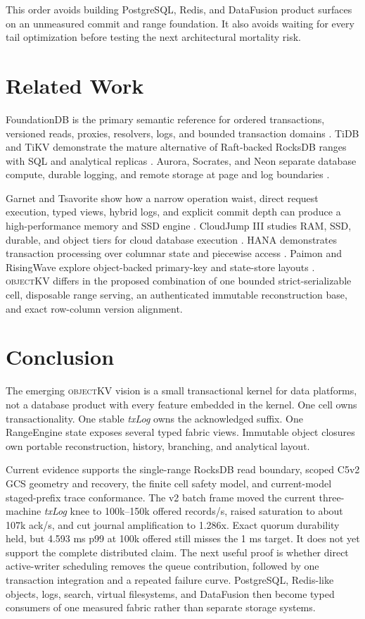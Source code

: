 \documentclass[sigconf,nonacm]{acmart}
\newcommand{\okv}{\textsc{objectKV}}
\newcommand{\txlog}{\textit{txLog}}
\begin{document}
This order avoids building PostgreSQL, Redis, and DataFusion product surfaces on
an unmeasured commit and range foundation. It also avoids waiting for every tail
optimization before testing the next architectural mortality risk.

\section{Related Work}

FoundationDB is the primary semantic reference for ordered transactions,
versioned reads, proxies, resolvers, logs, and bounded transaction domains
\cite{fdb2021}. TiDB and TiKV demonstrate the mature alternative of Raft-backed
RocksDB ranges with SQL and analytical replicas \cite{tidb2020}. Aurora,
Socrates, and Neon separate database compute, durable logging, and remote storage
at page and log boundaries \cite{aurora2017,socrates2019,neon2022}.

Garnet and Tsavorite show how a narrow operation waist, direct request
execution, typed views, hybrid logs, and explicit commit depth can produce a
high-performance memory and SSD engine \cite{garnet2025}. CloudJump III studies
RAM, SSD, durable, and object tiers for cloud database execution
\cite{cloudjumpiii2026}. HANA demonstrates transaction processing over columnar
state and piecewise access \cite{hana2012,hananse2019}. Paimon and RisingWave
explore object-backed primary-key and state-store layouts
\cite{paimonpk,paimonpfile,risingwavestore}. \okv{} differs in the proposed
combination of one bounded strict-serializable cell, disposable range serving,
an authenticated immutable reconstruction base, and exact row-column version
alignment.

\section{Conclusion}

The emerging \okv{} vision is a small transactional kernel for data platforms,
not a database product with every feature embedded in the kernel. One cell owns
transactionality. One stable \txlog{} owns the acknowledged suffix. One
RangeEngine state exposes several typed fabric views. Immutable object closures
own portable reconstruction, history, branching, and analytical layout.

Current evidence supports the single-range RocksDB read boundary, scoped C5v2
GCS geometry and recovery, the finite cell safety model, and current-model
staged-prefix trace conformance. The v2 batch frame moved the current
three-machine \txlog{} knee to 100k--150k offered records/s, raised saturation
to about 107k ack/s, and cut journal amplification to 1.286x. Exact quorum
durability held, but 4.593 ms p99 at 100k offered still misses the 1 ms target.
It does not yet support the complete distributed claim. The next useful proof
is whether direct active-writer scheduling removes the queue contribution,
followed by one transaction integration and a repeated failure curve.
PostgreSQL, Redis-like objects, logs, search, virtual filesystems, and DataFusion
then become typed consumers of one measured fabric rather than separate storage
systems.

\balance


\end{document}
